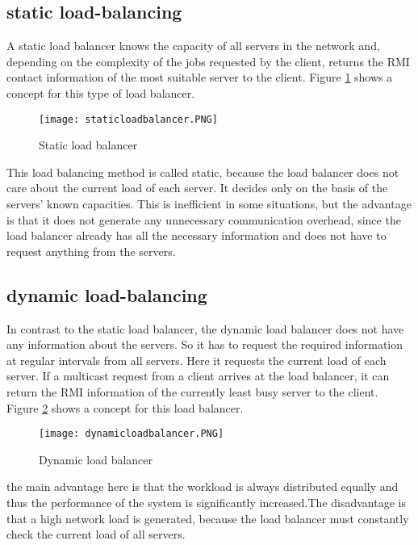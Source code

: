 \subsection{static load-balancing}
A static load balancer knows the capacity of all servers in the network and, depending on the complexity of the jobs requested by the client, returns the RMI contact information of the most suitable server to the client. Figure \ref{staticloadbalancer} shows a concept for this type of load balancer.
\begin{figure}[H]
	\centering
	\texttt{[image: staticloadbalancer.PNG]}
	\caption{Static load balancer}
	\label{staticloadbalancer}
\end{figure} 
This load balancing method is called static, because the load balancer does not care about the current load of each server. It decides only on the basis of the servers' known capacities. This is inefficient in some situations, but the advantage is that it does not generate any unnecessary communication overhead, since the load balancer already has all the necessary information and does not have to request anything from the servers.
\subsection{dynamic load-balancing}
In contrast to the static load balancer, the dynamic load balancer does not have any information about the servers. So it has to request the required information at regular intervals from all servers. Here it requests the current load of each server. If a multicast request from a client arrives at the load balancer, it can return the RMI information of the currently least busy server to the client. Figure \ref{dynamicloadbalancer} shows a concept for this load balancer.
\begin{figure}[H]
	\centering
	\texttt{[image: dynamicloadbalancer.PNG]}
	\caption{Dynamic load balancer}
	\label{dynamicloadbalancer}
\end{figure} 
the main advantage here is that the workload is always distributed equally and thus the performance of the system is significantly increased.The disadvantage is that a high network load is generated, because the load balancer must constantly check the current load of all servers.
